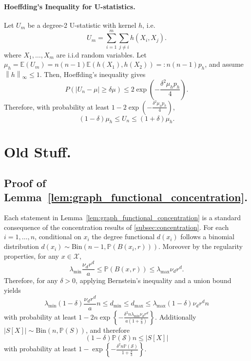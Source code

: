 \documentclass{article}
\newcommand{\norm}[1]{\left\lVert#1\right\rVert}
\newcommand{\abs}[1]{\left \lvert #1 \right \rvert}
\newcommand{\set}[1]{\left\{#1\right\}}
\newcommand{\Pbb}{\mathbb{P}}
\newcommand{\1}{\mathbf{1}}
\theoremstyle{alden}
\theoremstyle{aldenthm}
\theoremstyle{remark}
\begin{document}
\paragraph{Hoeffding's Inequality for U-statistics.}
Let $U_m$ be a degree-2 U-statistic with kernel $h$, i.e.
\begin{equation*}
U_m = \sum_{i = 1}^{m} \sum_{j \neq i} h(X_i,X_j).
\end{equation*}
where $X_1,\ldots, X_m$ are i.i.d random variables. Let $\mu_h = \mathbb{E}(U_m) = n(n-1)\mathbb{E}(h(X_1),h(X_2)) =:n(n-1)p_h$, and assume $\norm{h}_{\infty} \leq 1$. Then, Hoeffding's inequality gives
\begin{equation*}
P(\abs{U_n - \mu} \geq \delta \mu) \leq 2 \exp\left(-\frac{\delta^2 \mu_h p_h}{4}\right).
\end{equation*}
Therefore, with probability at least $1 - 2 \exp\left(-\frac{\delta^2 \mu_h p_h}{4}\right)$,
\begin{equation*}
(1 - \delta) \mu_h \leq U_n \leq (1 + \delta) \mu_h.
\end{equation*}

\section{Old Stuff.}
\subsection{Proof of Lemma~\ref{lem:graph_functional_concentration}.}
Each statement in Lemma~\ref{lem:graph_functional_concentration} is a standard consequence of the concentration results of \ref{subsec:concentration}. For each $i = 1,\ldots,n$, conditional on $x_i$ the degree functional $d(x_i)$ follows a binomial distribution $d(x_i) \sim \textrm{Bin}(n - 1, \Pbb(B(x_i,r)))$. Moreover by the regularity properties, for any $x \in \mathcal{X}$,
\begin{equation*}
\lambda_{\min} \frac{\nu_d r^d}{a} \leq \Pbb(B(x,r)) \leq \lambda_{\max} \nu_d r^d.
\end{equation*}
Therefore, for any $\delta > 0$, applying Bernstein's inequality and a union bound yields
\begin{equation}
\label{eqn:graph_functional_concentration_pf1}
\lambda_{\min} (1 - \delta) \frac{\nu_d r^d}{a} n \leq d_{\min} \leq d_{\max} \leq  \lambda_{\max} (1 - \delta) \nu_d r^d n
\end{equation}
with probability at least $1 - 2 n\exp\set{-\frac{\delta^2 n \lambda_{\min} \nu_d r^d}{a\left(1 + \frac{\delta}{3}\right)}}$. Additionally $\abs{S[X]} \sim \mathrm{Bin}(n, \Pbb(S))$, and therefore
\begin{equation}
\label{eqn:graph_functional_concentration_pf2}
(1 - \delta) \Pbb(\mathcal{S}) n \leq \abs{S[X]}
\end{equation}
with probability at least $1 - \exp\set{-\frac{\delta^2n\Pbb(\mathcal{S})}{1 + \frac{\delta}{3}}}$. 
\end{document}
